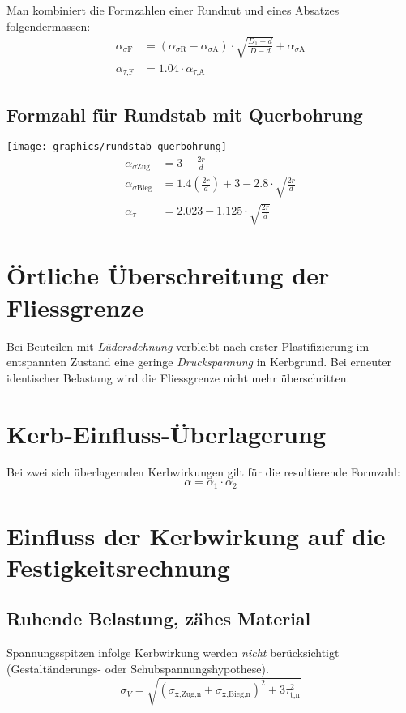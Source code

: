 		Man kombiniert die Formzahlen einer Rundnut und eines Absatzes folgendermassen:
		\begin{align*}
			\alpha_{\sigma\text{F}} &= (\alpha_{\sigma\text{R}}-\alpha_{\sigma\text{A}}) \cdot \sqrt{\frac{D_1-d}{D-d}} + \alpha_{\sigma\text{A}} \\
			\alpha_{\tau\text{,F}} &= 1.04 \cdot \alpha_{\tau\text{,A}}
		\end{align*}
	\subsection{Formzahl für Rundstab mit Querbohrung} %
		\texttt{[image: graphics/rundstab\_querbohrung]}
		\begin{align*}
			\alpha_{\sigma\text{Zug}} &= 3 - \frac{2r}{d} \\
			\alpha_{\sigma\text{Bieg}} &= 1.4 \left( \frac{2r}{d}\right) + 3 - 2.8\cdot \sqrt{\frac{2r}{d}} \\
			\alpha_{\tau} &= 2.023 - 1.125\cdot\sqrt{\frac{2r}{d}}
		\end{align*}
\section{Örtliche Überschreitung der Fliessgrenze} %
	Bei Beuteilen mit \emph{Lüdersdehnung} verbleibt nach erster Plastifizierung im entspannten Zustand eine geringe \emph{Druckspannung} in Kerbgrund. Bei erneuter identischer Belastung wird die Fliessgrenze nicht mehr überschritten.
\section{Kerb-Einfluss-Überlagerung} %
	Bei zwei sich überlagernden Kerbwirkungen gilt für die resultierende Formzahl:
	\begin{equation*}
		\alpha = \alpha_1 \cdot \alpha_2
	\end{equation*}
\section{Einfluss der Kerbwirkung auf die Festigkeitsrechnung} %
	\subsection{Ruhende Belastung, zähes Material} %
		Spannungsspitzen infolge Kerbwirkung werden \emph{nicht} be\-rück\-sich\-tigt (Gestaltänderungs- oder Schubspannungshypothese).
		\begin{equation*}
			\sigma_V = \sqrt{(\sigma_{\text{x,Zug,n}} + \sigma_{\text{x,Bieg,n}})^2 + 3 \tau_{\text{t,n}}^2}
		\end{equation*}
